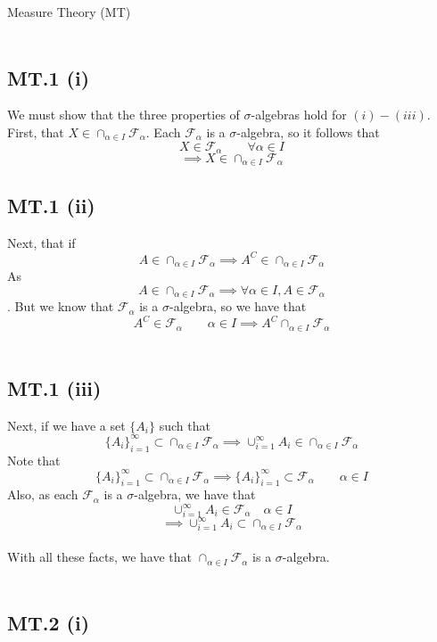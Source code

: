 \documentclass[letterpaper,12pt]{article}
\theoremstyle{definition}
\begin{document}
Measure Theory (MT) \\\\

\subsection*{MT.1 (i)}


We must show that the three properties of $\sigma$-algebras hold for $(i)-(iii)$.\\
First, that $X \in  \cap _{\alpha \in I} \mathscr{F}_\alpha$. Each $\mathscr{F}_\alpha $ is a $\sigma$-algebra, so it follows that \[X \in \mathscr{F}_\alpha \qquad \forall \alpha\in I\]\[ \implies X \in \cap_{\alpha\in I}\mathscr{F}_\alpha\]

\subsection*{MT.1 (ii)}

Next, that if \[A \in \cap_{\alpha\in I}\mathscr{F}_\alpha \implies A^{C} \in\cap_{\alpha\in I}\mathscr{F}_\alpha\] As \[A \in \cap_{\alpha\in I}\mathscr{F}_\alpha \implies \forall \alpha \in I, A \in \mathscr{F}_\alpha\]. But we know that $\mathscr{F}_\alpha$ is a $\sigma$-algebra, so we have that \[A^C \in \mathscr{F}_\alpha \qquad \alpha\in I \implies A^C \cap_{\alpha\in I}\mathscr{F}_\alpha\] \\

\subsection*{MT.1 (iii)}

Next, if we have a set $\{A_i\}$ such that \[\{A_i\}_{i=1}^{\infty} \subset \cap_{\alpha\in I}\mathscr{F}_\alpha \implies \cup_{i=1}^{\infty}A_i \in \cap_{\alpha\in I}\mathscr{F}_\alpha\]
Note that
\[\{A_i\}_{i=1}^{\infty} \subset \cap_{\alpha\in I}\mathscr{F}_\alpha \implies \{A_i\}_{i=1}^{\infty} \subset \mathscr{F}_\alpha \qquad \alpha \in I\]
Also, as each $\mathscr{F}_\alpha$ is a $\sigma$-algebra, we have that
\[\cup_{i=1}^{\infty}A_i \in \mathscr{F}_\alpha \quad \alpha \in I\]\[ \implies \cup_{i=1}^{\infty}A_i \subset \cap_{\alpha\in I}\mathscr{F}_\alpha\]\\
With all these facts, we have that $\cap_{\alpha\in I}\mathscr{F}_\alpha$ is a  $\sigma$-algebra.\\\\




\subsection*{MT.2 (i)}
\end{document}
